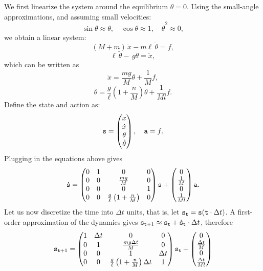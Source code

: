 \begin{example}
We first linearize the system around the equilibrium \(\theta = 0\). Using the small-angle approximations, and assuming small velocities:
\[
\sin\theta \approx \theta, \quad \cos\theta \approx 1, \quad \dot{\theta}^2 \approx 0,
\]
we obtain a linear system:
\[
(M + m)\,\ddot{x} - m\ell\,\ddot{\theta} = f,
\]
\[
\ell\,\ddot{\theta} - \,g\theta = \ddot{x},
\]
which can be written as
\[
\ddot{x} = \frac{mg}{M}{\theta} + \frac{1}{M}f,
\]
\[
\ddot{\theta} = \frac{g}{\ell}\left(1+\frac{n}{M}\right)\theta + \frac{1}{Ml}f.
\]
Define the state and action as:
\[
{\tt s} = \begin{pmatrix} x \\ \dot{x} \\ \theta \\ \dot{\theta} \end{pmatrix}, \quad {\tt a} = f.
\]
Plugging in the equations above gives 
\begin{equation*}
    \dot{{\tt s}} = \begin{pmatrix} 0 & 1 & 0 & 0 \\ 
    0 & 0 & \frac{mg}{M} & 0 \\
    0 & 0 & 0 & 1 \\
    0 & 0 & \frac{g}{\ell}\left(1+\frac{n}{M}\right) & 0\end{pmatrix} {\tt s} + 
    \begin{pmatrix} 
    0 \\ \frac{1}{M} \\ 0 \\ \frac{1}{Ml}
    \end{pmatrix} {\tt a}.
\end{equation*}
Let us now discretize the time into $\Delta t$ units, that is, let ${\tt s}_{\tt t} = {\tt s}({\tt t} \cdot \Delta t)$. A first-order approximation of the dynamics gives ${\tt s}_{{\tt t}+1} \approx {\tt s}_{{\tt t}} + \dot{{\tt s}}_{{\tt t}} \cdot \Delta t$, therefore
\begin{equation*}
    {\tt s}_{{\tt t}+1} = \begin{pmatrix} 1 & \Delta t & 0 & 0 \\ 
    0 & 1 & \frac{mg\Delta t}{M} & 0 \\
    0 & 0 & 1 & \Delta t \\
    0 & 0 & \frac{g}{\ell}\left(1+\frac{n}{M}\right)\Delta t & 1\end{pmatrix} {\tt s}_{{\tt t}} + 
    \begin{pmatrix} 
    0 \\ \frac{\Delta t}{M} \\ 0 \\ \frac{\Delta t}{Ml}

\end{pmatrix}
\end{equation*}
\end{example}
